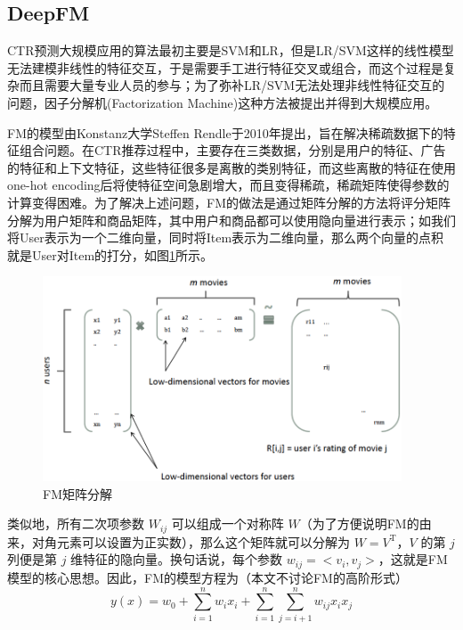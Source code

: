 \subsection{DeepFM}

CTR预测大规模应用的算法最初主要是SVM和LR，但是LR/SVM这样的线性模型无法建模非线性的特征交互，于是需要手工进行特征交叉或组合，而这个过程是复杂而且需要大量专业人员的参与；为了弥补LR/SVM无法处理非线性特征交互的问题，因子分解机(Factorization Machine)这种方法被提出并得到大规模应用。

FM\cite{rendle2010factorization}的模型由Konstanz大学Steffen Rendle于2010年提出，旨在解决稀疏数据下的特征组合问题。在CTR推荐过程中，主要存在三类数据，分别是用户的特征、广告的特征和上下文特征，这些特征很多是离散的类别特征，而这些离散的特征在使用one-hot encoding后将使特征空间急剧增大，而且变得稀疏，稀疏矩阵使得参数的计算变得困难。为了解决上述问题，FM的做法是通过矩阵分解的方法将评分矩阵分解为用户矩阵和商品矩阵，其中用户和商品都可以使用隐向量进行表示\cite{FactorizationMachines}；如我们将User表示为一个二维向量，同时将Item表示为二维向量，那么两个向量的点积就是User对Item的打分，如图\ref{UserItemResolve}所示。
\begin{figure}[htb]
  \vspace{13pt} %
  \centering
  \includegraphics[width=0.95\textwidth]{images/UserItemResolve.png}
  \caption{FM矩阵分解\cite{MeituanFM}}\label{UserItemResolve} %
\end{figure}




类似地，所有二次项参数 $W_{ij}$ 可以组成一个对称阵 $W$（为了方便说明FM的由来，对角元素可以设置为正实数），那么这个矩阵就可以分解为 $W=V^\mathrm{T}$，$V$ 的第 $j$ 列便是第 $j$ 维特征的隐向量。换句话说，每个参数 $w_{ij} = <v_{i},v_j>$，这就是FM模型的核心思想。因此，FM的模型方程为（本文不讨论FM的高阶形式）
\begin{equation}
  y(x) = w_{0} + \sum_{i = 1}^n w_{i}x_{i} + \sum_{i = 1}^n\sum_{j = i + 1}^n w_{ij}x_{i}x_{j}
\end{equation}



